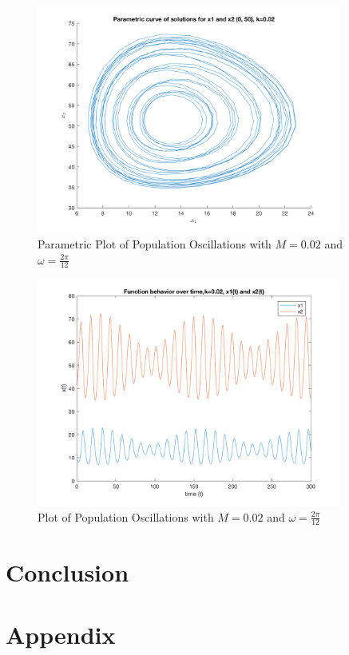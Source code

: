\documentclass[12pt]{article}   %
\theoremstyle{definition}
\numberwithin{equation}{section}
\begin{document}
\begin{figure} [h] 
  \centering
    \includegraphics[width=10cm]{images/circM.png}
  \caption{Parametric Plot of Population Oscillations with $M=0.02$ and $\omega=\frac{2\pi}{12}$}
  \label{fig:circM}
\end{figure}

\begin{figure} [h] 
  \centering
    \includegraphics[width=10cm]{images/updownM.png}
  \caption{Plot of Population Oscillations with $M=0.02$ and $\omega=\frac{2\pi}{12}$}
  \label{fig:updownM}
\end{figure}

\newpage
\setcounter{page}{4}
\section{Conclusion} \label{APPM2360proj01sec01}


\newpage
\setcounter{page}{7}
\section{Appendix} \label{APPM2360proj01sec01}
\end{document}
